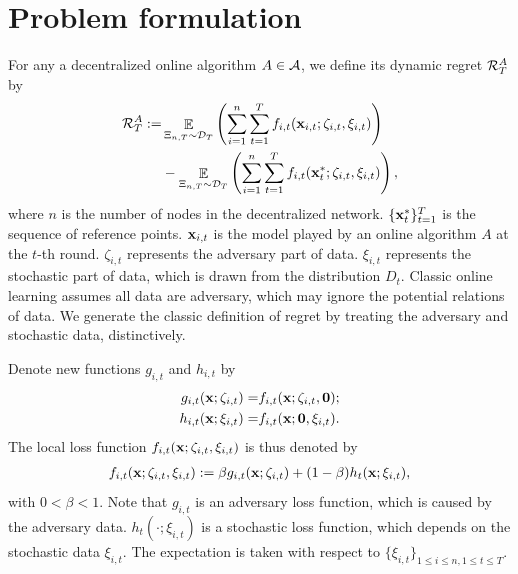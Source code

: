 \documentclass{article}
\begin{document}
\section{Problem formulation}


For any a decentralized online algorithm $A \in {\mathcal{A}}$, we define its dynamic regret ${\mathcal{R}}_T^{A}$ by
\begin{align}
\nonumber
{\mathcal{R}}_T^{A} := & \mathop{\mathbb{E}}_{ \Xi_{n,T} \sim \mathcal{D}_{T} } \left(  \sum_{i=1}^n\sum_{t=1}^T f_{i,t}({\bf x}_{i,t};\zeta_{i,t},\xi_{i,t})  \right) \\ \label{equa_definition_our_regret} 
&- \mathop{\mathbb{E}}_{ \Xi_{n,T} \sim \mathcal{D}_{T} } \left(  \sum_{i=1}^n\sum_{t=1}^T f_{i,t}({\bf x}_t^\ast;\zeta_{i,t},\xi_{i,t})  \right),
\end{align} where $n$ is the number of nodes in the decentralized network. $\{{\bf x}_t^\ast\}_{t=1}^T$ is the sequence of reference points. ${\bf x}_{i,t}$ is the model played by an online algorithm $A$ at the $t$-th round. $\zeta_{i,t}$ represents the adversary part of data. $\xi_{i,t}$ represents the stochastic part of data, which is drawn from the distribution $D_t$. Classic online learning assumes all data are adversary, which may ignore the potential relations of data. We generate the classic definition of regret by treating the adversary and stochastic data, distinctively.


Denote new functions $g_{i,t}$ and $h_{i,t}$ by 
\begin{align}
\nonumber
g_{i,t}({\bf x};\zeta_{i,t}) = & f_{i,t}({\bf x};\zeta_{i,t},{\bf 0}); \\ \nonumber
h_{i,t}({\bf x};\xi_{i,t}) = & f_{i,t}({\bf x};{\bf 0},\xi_{i,t}).
\end{align} The local loss function $f_{i,t}({\bf x};\zeta_{i,t},\xi_{i,t})$ is thus denoted by
\begin{align}
\nonumber
f_{i,t}({\bf x};\zeta_{i,t},\xi_{i,t}) := \beta g_{i,t}({\bf x};\zeta_{i,t}) + (1-\beta) h_t({\bf x}; \xi_{i,t}), 
\end{align} with $0<\beta<1$.   Note that $g_{i,t}$ is an adversary loss function, which is caused by the adversary data. $h_t(\cdot; \xi_{i,t})$ is a stochastic loss function, which depends on the stochastic data $\xi_{i,t}$. The expectation is taken with respect to $\{\xi_{i,t}\}_{1\le i\le n,1\le t\le T}$. 
\end{document}
